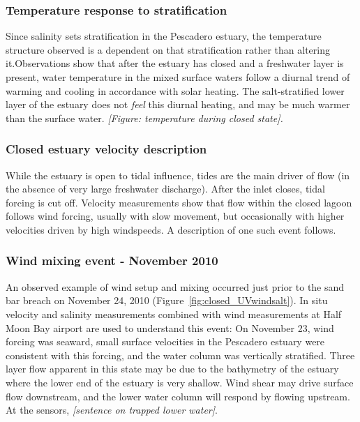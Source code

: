 {\subsubsection{Temperature response to stratification} \label{sssec:TempResStrat}

Since salinity sets stratification in the Pescadero estuary, the temperature structure observed is a dependent on that stratification rather than altering it.Observations show that after the estuary has closed and a freshwater layer is present, water temperature in the mixed surface waters follow a diurnal trend of warming and cooling in accordance with solar heating. The salt-stratified lower layer of the estuary does not \emph{feel} this diurnal heating, and may be much warmer than the surface water. \emph{[Figure: temperature during closed state].}

\subsubsection{Closed estuary velocity description} \label{cl_vel}
While the estuary is open to tidal influence, tides are the main driver of flow (in the absence of very large freshwater discharge). After the inlet closes, tidal forcing is cut off. Velocity measurements show that flow within the closed lagoon follows wind forcing, usually with slow movement, but occasionally with higher velocities driven by high windspeeds. A description of one such event follows.


\subsubsection{Wind mixing event - November 2010} \label{sssec:WindMixNov10}

An observed example of wind setup and mixing occurred just prior to the sand bar breach on November 24, 2010 (Figure~\ref{fig:closed_UVwindsalt}). In situ velocity and salinity measurements combined with wind measurements at Half Moon Bay airport are used to understand this event: 
On November 23, wind forcing was seaward, small surface velocities in the Pescadero estuary were consistent with this forcing, and the water column was vertically stratified. Three layer flow apparent in this state may be due to the bathymetry of the estuary where the lower end of the estuary is very shallow. Wind shear may drive surface flow downstream, and the lower water column will respond by flowing upstream.
At the sensors, \emph{[sentence on trapped lower water]}.

}
